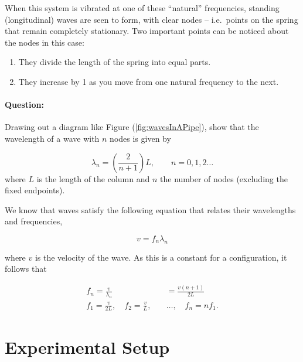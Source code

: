 \begin{refsection}
When this system is vibrated at one of these ``natural'' frequencies, standing (longitudinal) waves are seen to form, with clear nodes -- i.e.\ points on the spring that remain completely stationary. Two important points can be noticed about the nodes in this case:

\begin{enumerate}[label=(\alph*)]
    \item They divide the length of the spring into equal parts.
    \item They increase by 1 as you move from one natural frequency to the next.
\end{enumerate}

\begin{question}
\paragraph{Question:} Drawing out a diagram like Figure (\ref{fig:wavesInAPipe}), show that the wavelength of a wave with $n$ nodes is given by

\begin{equation}
    \lambda_n = \left(\frac{2}{n+1}\right) L , \quad \quad n=0,1,2\hdots
\end{equation}
where $L$ is the length of the column and $n$ the number of nodes (excluding the fixed endpoints).
\end{question}


We know that waves satisfy the following equation that relates their wavelengths and frequencies, 

\begin{equation}
    v = f_n \lambda_n
\end{equation}

where $v$ is the velocity of the wave. As this is a constant for a configuration, it follows that 

\begin{equation}
\begin{aligned}
f_n = \frac{v}{\lambda_n} &= \frac{v (n+1)}{2L}\\
f_1 = \frac{v}{2L}, \quad f_2 = \frac{v}{L},\quad &\hdots,\quad f_n = n f_1.
\end{aligned}
\end{equation}



\section*{Experimental Setup}


\end{refsection}
